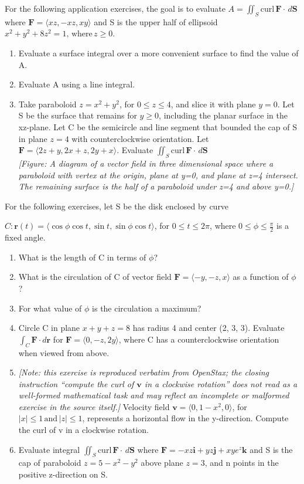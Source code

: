 \documentclass{exercises}
\begin{document}
For the following application exercises, the goal is to evaluate $A=\iint_{S}\text{curl}\,\mathbf{F}\cdot \,d\mathbf{S}$ where $\mathbf{F}=\langle xz,-xz,xy\rangle$ and S is the upper half of ellipsoid $x^{2}+y^{2}+8z^{2}=1,\,\text{where}\,z\ge0$.

\begin{enumerate}[resume]
\item Evaluate a surface integral over a more convenient surface to find the value of A.
\item Evaluate A using a line integral.
\item Take paraboloid $z=x^{2}+y^{2}$, for $0\le z\le4$, and slice it with plane $y=0$. Let S be the surface that remains for $y\ge0$, including the planar surface in the xz-plane. Let C be the semicircle and line segment that bounded the cap of S in plane $z=4$ with counterclockwise orientation. Let $\mathbf{F}=\langle2z+y,2x+z,2y+x\rangle$. Evaluate $\iint_{S}\text{curl}\,\mathbf{F}\cdot \,d\mathbf{S}$ \\ \textit{[Figure: A diagram of a vector field in three dimensional space where a paraboloid with vertex at the origin, plane at y=0, and plane at z=4 intersect. The remaining surface is the half of a paraboloid under z=4 and above y=0.]}
\end{enumerate}

For the following exercises, let S be the disk enclosed by curve


$C:\mathbf{r}(t)=\langle \cos \phi \cos t,\sin t,\sin \phi \cos t\rangle$, for $0\le t\le2\pi$, where $0\le \phi \le \frac{\pi}{2}$ is a fixed angle.

\begin{enumerate}[resume]
\item What is the length of C in terms of $\phi$?
\item What is the circulation of C of vector field $\mathbf{F}=\langle-y,-z,x\rangle$ as a function of $\phi$?
\item For what value of $\phi$ is the circulation a maximum?
\item Circle C in plane $x+y+z=8$ has radius 4 and center (2, 3, 3). Evaluate $\int_{C}\mathbf{F}\cdot d\mathbf{r}$ for $\mathbf{F}=\langle0,-z,2y\rangle$, where C has a counterclockwise orientation when viewed from above.
\item \textit{[Note: this exercise is reproduced verbatim from OpenStax; the closing instruction ``compute the curl of $\mathbf{v}$ in a clockwise rotation'' does not read as a well-formed mathematical task and may reflect an incomplete or malformed exercise in the source itself.]} Velocity field $\mathbf{v}=\langle0,1-x^{2},0\rangle$, for $|x|\le1\,\text{and}\,|z|\le1$, represents a horizontal flow in the y-direction. Compute the curl of v in a clockwise rotation.
\item Evaluate integral $\iint_{S}\text{curl}\,\mathbf{F}\cdot \,d\mathbf{S}$ where $\mathbf{F}=-xz\mathbf{i}+yz\mathbf{j}+xye^{z}\mathbf{k}$ and S is the cap of paraboloid $z=5-x^{2}-y^{2}$ above plane $z=3$, and n points in the positive z-direction on S.
\end{enumerate}
\end{document}

